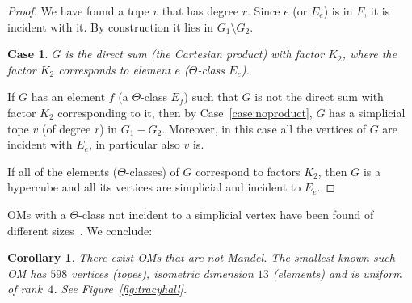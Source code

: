 \documentclass[final,11pt]{article}
\newtheorem{cor}[thm]{Corollary}%
\newtheorem{case}{Case}
\begin{document}
\begin{proof}

We have found a tope $v$ that has degree $r$. Since $e$ (or $E_e$) is in $F$, it is incident with it. By construction it lies in $G_1 \setminus G_2$.

\begin{case}
 $G$ is the direct sum (the Cartesian product) with factor $K_2$, where the factor $K_2$ corresponds to element $e$ ($\Theta$-class $E_e$).
\end{case}

If $G$ has an element $f$ (a $\Theta$-class $E_f$) such that $G$ is not the direct sum with factor $K_2$ corresponding to it, then by Case~\ref{case:noproduct}, $G$ has a simplicial tope $v$ (of degree $r$) in $G_1 - G_2$. Moreover, in this case all the vertices of $G$ are incident with $E_e$, in particular also $v$ is.

If all of the elements ($\Theta$-classes) of $G$ correspond to factors $K_2$, then $G$ is a hypercube and all its vertices are simplicial and incident to $E_e$.
\end{proof}

OMs with a $\Theta$-class not incident to a simplicial vertex have been found of different sizes~\cite{Ric-93, Bok-01, Tra-04}. We conclude:


\begin{cor}\label{cor:Mandelwaswrong}
 There exist OMs that are not Mandel. The smallest known such OM has $598$ vertices (topes), isometric dimension $13$ (elements) and is uniform of rank~$4$. See Figure~\ref{fig:tracyhall}. 
\end{cor}

% 
\end{document}
